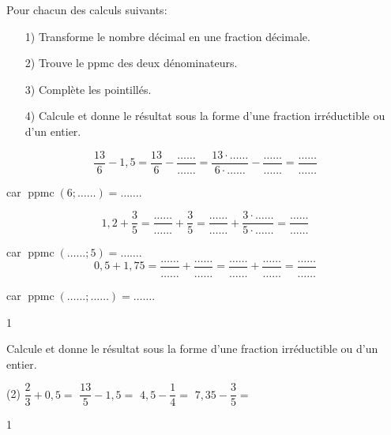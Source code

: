 \documentclass[a4paper,11pt]{report}
\begin{document}
\begin{exop}
{Pour chacun des calculs suivants:
	\begin{enumerate}
    \item[1)] Transforme le nombre décimal en une fraction décimale.
    \item[2)] Trouve le ppmc des deux dénominateurs.
    \item[3)] Complète les pointillés.
    \item[4)] Calcule et donne le résultat sous la forme d'une fraction irréductible ou d'un entier.
\end{enumerate}
\vspace{1pt}

\begin{tasks}
	\task \[\dfrac{13}{6}-1,5=\dfrac{13}{6}-\dfrac{\ldots\ldots}{\ldots\ldots}=\dfrac{13\cdot \ldots\ldots}{6\cdot \ldots\ldots}-\dfrac{\ldots\ldots}{\ldots\ldots}=\dfrac{\ldots\ldots}{\ldots\ldots}\]
\vspace{1pt}

		car $\operatorname{ppmc}(6;\ldots\ldots)=\ldots\ldots$.

	\task \[1,2+\dfrac{3}{5}=\dfrac{\ldots\ldots}{\ldots\ldots}+\dfrac{3}{5}=\dfrac{\ldots\ldots}{\ldots\ldots}+\dfrac{3\cdot \ldots\ldots}{5\cdot \ldots\ldots}=\dfrac{\ldots\ldots}{\ldots\ldots}\]
\vspace{1pt}

		car $\operatorname{ppmc}(\ldots\ldots;5)=\ldots\ldots$.
	\task \[0,5+1,75=\dfrac{\ldots\ldots}{\ldots\ldots}+\dfrac{\ldots\ldots}{\ldots\ldots}=\dfrac{\ldots\ldots}{\ldots\ldots}+\dfrac{\ldots\ldots}{\ldots\ldots}=\dfrac{\ldots\ldots}{\ldots\ldots}\]
\vspace{1pt}

		car $\operatorname{ppmc}(\ldots\ldots;\ldots\ldots)=\ldots\ldots$.
\end{tasks}}
{1}
\end{exop}



\begin{exo}
 {Calcule et donne le résultat sous la forme d'une fraction irréductible ou d'un entier.
	 \begin{tasks}(2)
\task $\dfrac{2}{3}+0,5=$
\task $\dfrac{13}{5}-1,5=$
\task $4,5-\dfrac{1}{4}=$
\task $7,35-\dfrac{3}{5}=$
\end{tasks}}
{1}
\end{exo}
\end{document}
